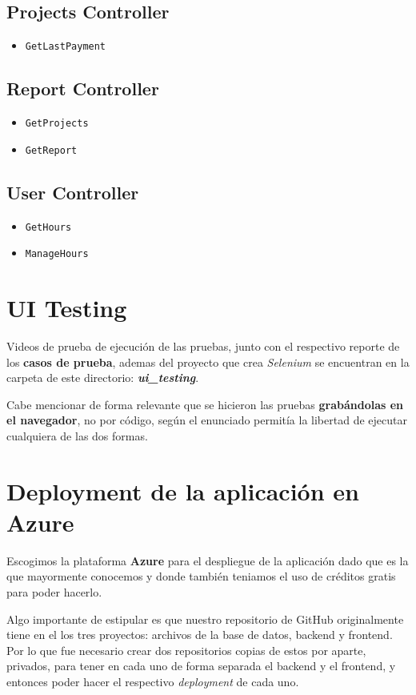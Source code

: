\documentclass{article}
\begin{document}
\subsection{Projects Controller}
\begin{itemize}
  \item \texttt{GetLastPayment}
\end{itemize}

\subsection{Report Controller}
\begin{itemize}
  \item \texttt{GetProjects}
  \item \texttt{GetReport}
\end{itemize}

\subsection{User Controller}
\begin{itemize}
  \item \texttt{GetHours}
  \item \texttt{ManageHours}
\end{itemize}

\section{UI Testing}
Videos de prueba de ejecución de las pruebas, junto con el respectivo reporte de los
\textbf{casos de prueba}, ademas del proyecto que crea \textit{Selenium} se encuentran
en la carpeta de este directorio: \textbf{\textit{ui\_testing}}.

Cabe mencionar de forma relevante que se hicieron las pruebas \textbf{grabándolas en el navegador},
no por código, según el enunciado permitía la libertad de ejecutar cualquiera de las dos formas.

\section{Deployment de la aplicación en Azure}
Escogimos la plataforma \textbf{Azure} para el despliegue de la aplicación dado que es la que
mayormente conocemos y donde también teniamos el uso de créditos gratis para poder hacerlo.

Algo importante de estipular es que nuestro repositorio de GitHub originalmente tiene en
el los tres proyectos: archivos de la base de datos, backend y frontend. Por lo que fue
necesario crear dos repositorios copias de estos por aparte, privados, para tener en cada
uno de forma separada el backend y el frontend, y entonces poder hacer el respectivo
\textit{deployment} de cada uno.
\end{document}

